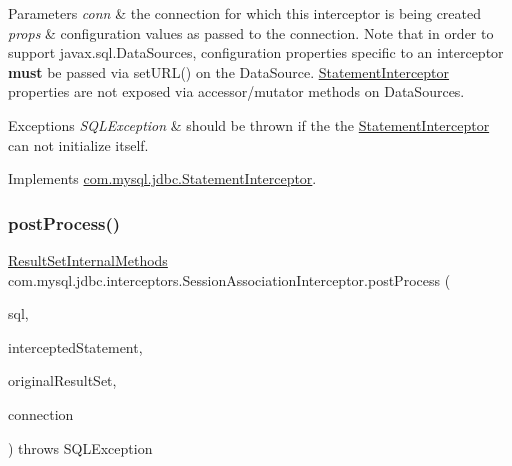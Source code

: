 \begin{DoxyParams}{Parameters}
{\em conn} & the connection for which this interceptor is being created \\
\hline
{\em props} & configuration values as passed to the connection. Note that in order to support javax.\+sql.\+Data\+Sources, configuration properties specific to an interceptor {\bfseries must} be passed via set\+U\+R\+L() on the Data\+Source. \mbox{\hyperlink{interfacecom_1_1mysql_1_1jdbc_1_1_statement_interceptor}{Statement\+Interceptor}} properties are not exposed via accessor/mutator methods on Data\+Sources.\\
\hline
\end{DoxyParams}

\begin{DoxyExceptions}{Exceptions}
{\em S\+Q\+L\+Exception} & should be thrown if the the \mbox{\hyperlink{interfacecom_1_1mysql_1_1jdbc_1_1_statement_interceptor}{Statement\+Interceptor}} can not initialize itself. \\
\hline
\end{DoxyExceptions}


Implements \mbox{\hyperlink{interfacecom_1_1mysql_1_1jdbc_1_1_statement_interceptor_a985c3d5d0c9b9694cfb73ba92273409e}{com.\+mysql.\+jdbc.\+Statement\+Interceptor}}.

\mbox{\label{classcom_1_1mysql_1_1jdbc_1_1interceptors_1_1_session_association_interceptor_aff86319f01d91f3ff73d649bd50a31d4}} 
\subsubsection{\texorpdfstring{post\+Process()}{postProcess()}}
{\footnotesize\ttfamily \mbox{\hyperlink{interfacecom_1_1mysql_1_1jdbc_1_1_result_set_internal_methods}{Result\+Set\+Internal\+Methods}} com.\+mysql.\+jdbc.\+interceptors.\+Session\+Association\+Interceptor.\+post\+Process (\begin{DoxyParamCaption}\item[{String}]{sql,  }\item[{\mbox{\hyperlink{interfacecom_1_1mysql_1_1jdbc_1_1_statement}{Statement}}}]{intercepted\+Statement,  }\item[{\mbox{\hyperlink{interfacecom_1_1mysql_1_1jdbc_1_1_result_set_internal_methods}{Result\+Set\+Internal\+Methods}}}]{original\+Result\+Set,  }\item[{\mbox{\hyperlink{interfacecom_1_1mysql_1_1jdbc_1_1_connection}{Connection}}}]{connection }\end{DoxyParamCaption}) throws S\+Q\+L\+Exception}


